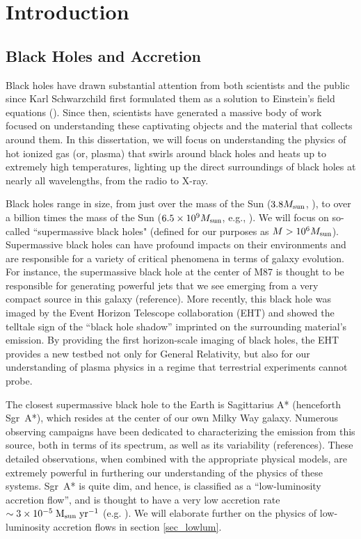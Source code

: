 \chapter[Introduction]
{Introduction}
\section{Black Holes and Accretion}

Black holes have drawn substantial attention from both scientists and the public since Karl Schwarzchild first formulated them as a solution to Einstein's field equations (\citealt{schwarzschild1916}).  Since then, scientists have generated a massive body of work focused on understanding these captivating objects and the material that collects around them.  In this dissertation, we will focus on understanding the physics of hot ionized gas (or, plasma) that swirls around black holes and heats up to extremely high temperatures, lighting up the direct surroundings of black holes at nearly all wavelengths, from the radio to X-ray.  

Black holes range in size, from just over the mass of the Sun ($3.8 M_{\rm{sun}}$, \citealt{smallbh}), to over a billion times the mass of the Sun ($6.5\times10^9 M_{\rm{sun}}$, e.g., \citealt{eht6}).  We will focus on so-called ``supermassive black holes" (defined for our purposes as $M>10^6 M_{\rm{sun}}$).  Supermassive black holes can have profound impacts on their environments and are responsible for a variety of critical phenomena in terms of galaxy evolution.  For instance, the supermassive black hole at the center of M87 is thought to be responsible for generating powerful jets that we see emerging from a very compact source in this galaxy (reference).  More recently, this black hole was imaged by the Event Horizon Telescope collaboration (EHT) and showed the telltale sign of the ``black hole shadow'' imprinted on the surrounding material's emission.  By providing the first horizon-scale imaging of black holes, the EHT provides a new testbed not only for General Relativity, but also for our understanding of plasma physics in a regime that terrestrial experiments cannot probe.

The closest supermassive black hole to the Earth is Sagittarius A* (henceforth Sgr~A*), which resides at the center of our own Milky Way galaxy.  Numerous observing campaigns have been dedicated to characterizing the emission from this source, both in terms of its spectrum, as well as its variability (references).  These detailed observations, when combined with the appropriate physical models, are extremely powerful in furthering our understanding of the physics of these systems.  Sgr~A* is quite dim, and hence, is classified as a ``low-luminosity accretion flow'', and is thought to have a very low accretion rate $\sim 3 \times 10^{-5} \; \rm{M_{sun}} \; \rm{yr}^{-1}$ (e.g. \citealt{quataert1999b}).  We will elaborate further on the physics of low-luminosity accretion flows in section \ref{sec_lowlum}.

